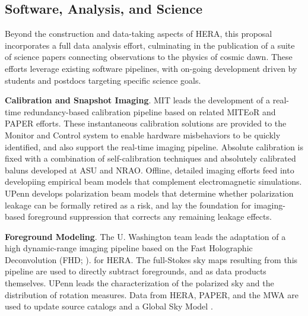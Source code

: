 \documentclass[preprint]{aastex}
\newcommand{\compress}{\vspace{-0.3in}}
\begin{document}
\compress
\subsection{Software, Analysis, and Science}
\label{sec:analysis}

Beyond the construction and data-taking aspects of HERA, this proposal
incorporates a full data analysis effort, culminating in the publication of a
suite of science papers connecting observations to the physics of cosmic dawn.
These efforts leverage existing software pipelines, with on-going 
development driven by students and postdocs targeting specific science goals.  


{\bf Calibration and Snapshot Imaging}. MIT leads
the development of a real-time redundancy-based calibration pipeline based on related
MITEoR and PAPER efforts.
These instantaneous calibration solutions are provided to
the Monitor and Control system to enable 
hardware misbehaviors to be quickly identified, and also support the
real-time imaging pipeline.  Absolute calibration is fixed with
a combination of self-calibration techniques and absolutely calibrated baluns developed at ASU and NRAO.
Offline, detailed imaging efforts feed into developiing
empirical beam models that
complement electromagnetic simulations.  UPenn develops polarization beam models
that determine whether polarization leakage can be formally retired as 
a risk, and lay the foundation for imaging-based foreground suppression that
corrects any remaining leakage effects.


{\bf Foreground Modeling}. The U. Washington team leads the adaptation
of a high dynamic-range imaging pipeline
based on the Fast Holographic Deconvolution (FHD; \citealt{sullivan_et_al2012}).
for HERA.  The full-Stokes sky maps resulting from this pipeline
are used to directly subtract foregrounds,
and as data products themselves.  UPenn leads
the characterization of the polarized sky and the
distribution of rotation measures.  Data from HERA, PAPER, and the MWA are used
to update source catalogs and a Global
Sky Model \citep{deoliveira2008}. %
\end{document}
